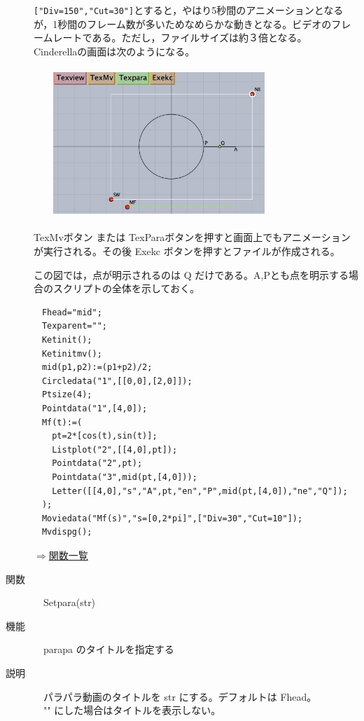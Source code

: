 \documentclass[papersize,a4paper,12pt,uplatex]{jsarticle}
\begin{document}
\begin{description}
\verb|["Div=150","Cut=30"]|とすると，やはり5秒間のアニメーションとなるが，1秒間のフレーム数が多いためなめらかな動きとなる。ビデオのフレームレートである。ただし，ファイルサイズは約３倍となる。\\
Cinderellaの画面は次のようになる。\\
　\\
　　\includegraphics[bb=0 0 1054 706 , width=8cm]{Figmv/moviedata01.png}\\
　\\
TexMvボタン または TexParaボタンを押すと画面上でもアニメーションが実行される。その後 Exekc ボタンを押すとファイルが作成される。

この図では，点が明示されるのは Q だけである。A,Pとも点を明示する場合のスクリプトの全体を示しておく。
\begin{verbatim}
　Fhead="mid";
　Texparent="";
　Ketinit();
　Ketinitmv();
　mid(p1,p2):=(p1+p2)/2;
　Circledata("1",[[0,0],[2,0]]);
　Ptsize(4);
　Pointdata("1",[4,0]);
　Mf(t):=(
　  pt=2*[cos(t),sin(t)];
　  Listplot("2",[[4,0],pt]);
　  Pointdata("2",pt);
　  Pointdata("3",mid(pt,[4,0]));
　  Letter([[4,0],"s","A",pt,"en","P",mid(pt,[4,0]),"ne","Q"]);  
　);
　Moviedata("Mf(s)","s=[0,2*pi]",["Div=30","Cut=10"]);
　Mvdispg();
\end{verbatim}
\begin{flushright} \hyperlink{functionlist3d}{$\Rightarrow$関数一覧}\end{flushright}

\hypertarget{setpara}{}
\item[関数]　Setpara(str)
\item[機能]　parapa のタイトルを指定する
\item[説明]　パラパラ動画のタイトルを str にする。デフォルトは Fhead。\\
　"" にした場合はタイトルを表示しない。

\end{description}

\newpage
\end{document}
